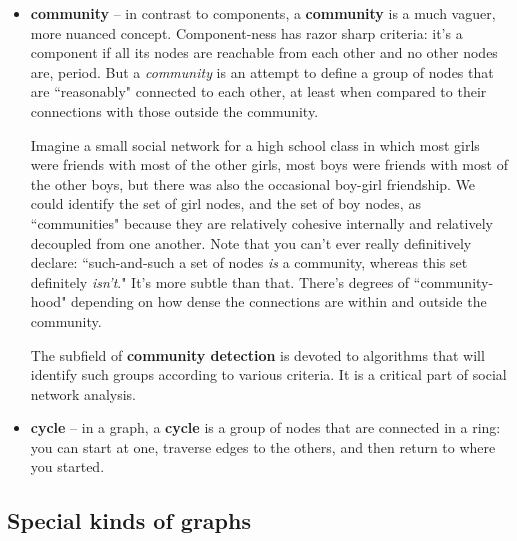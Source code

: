 \documentclass[12pt]{article}
\begin{document}
\begin{itemize}
\item \textbf{community} -- in contrast to components, a \textbf{community} is
a much vaguer, more nuanced concept. Component-ness has razor sharp criteria:
it's a component if all its nodes are reachable from each other and no other
nodes are, period. But a \textit{community} is an attempt to define a group of
nodes that are ``reasonably" connected to each other, at least when compared
to their connections with those outside the community.

Imagine a small social network for a high school class in which most girls
were friends with most of the other girls, most boys were friends with most of
the other boys, but there was also the occasional boy-girl friendship. We
could identify the set of girl nodes, and the set of boy nodes, as
``communities" because they are relatively cohesive internally and relatively
decoupled from one another. Note that you can't ever really definitively
declare: ``such-and-such a set of nodes \textit{is} a community, whereas this
set definitely \textit{isn't}." It's more subtle than that. There's degrees of
``community-hood" depending on how dense the connections are within and
outside the community.

The subfield of \textbf{community detection} is devoted to algorithms that
will identify such groups according to various criteria. It is a critical part
of social network analysis.

\item \textbf{cycle} -- in a graph, a \textbf{cycle} is a group of nodes that
are connected in a ring: you can start at one, traverse edges to the others,
and then return to where you started.

\end{itemize}

\subsection{Special kinds of graphs}
\end{document}
